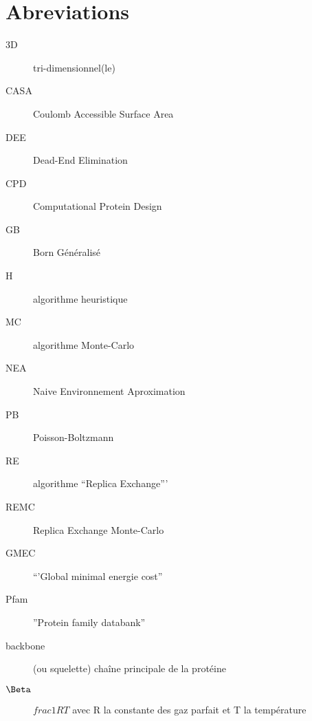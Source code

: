 \chapter*{Abreviations}

\begin{multicols}{2}

\begin{description}
\item[3D] tri-dimensionnel(le)
\item [CASA] Coulomb Accessible Surface Area
\item [DEE] Dead-End Elimination 
\item[CPD] Computational Protein Design
\item [GB] Born Généralisé
\item[H] algorithme heuristique
\item[MC] algorithme Monte-Carlo
\item[NEA] Naive Environnement Aproximation
\item [PB] Poisson-Boltzmann
\item[RE] algorithme ``Replica Exchange'''
\item [REMC] Replica Exchange Monte-Carlo
\item[GMEC] ``'Global minimal energie cost''
\item[Pfam] ''Protein family databank''
\item[backbone]  (ou squelette) chaîne principale de la protéine
\item [$\Beta$]  $frac{1}{RT}$ avec R la constante des gaz parfait et T la température
\end{description}

\end{multicols}

